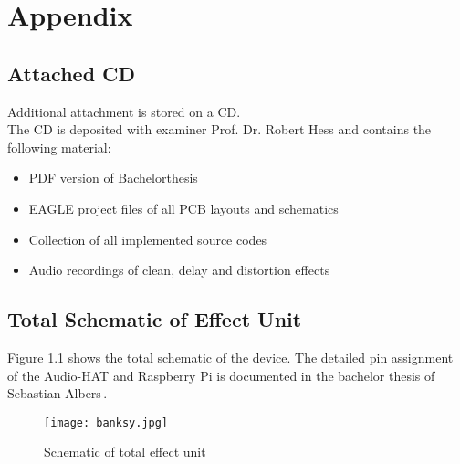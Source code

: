 \newpage
\chapter{Appendix}

\section{Attached CD}\label{DVD}

Additional attachment is stored on a CD.\\
The CD is deposited with examiner Prof. Dr. Robert Hess and contains the following material:

\begin{center} 
   \begin{varwidth}{7in} 
      \begin{itemize} 
      	 \item PDF version of Bachelorthesis 
         \item EAGLE project files of all PCB layouts and schematics
         \item Collection of all implemented source codes
         \item Audio recordings of clean, delay and distortion effects
      \end{itemize} 
   \end{varwidth} 
\end{center} 

\newpage
\section{Total Schematic of Effect Unit}

Figure \ref{fig:UMLoverall} shows the total schematic of the device.
The detailed pin assignment of the Audio-HAT and Raspberry Pi is documented in the bachelor thesis of Sebastian Albers\,\cite[p.\,99]{Albers:2017}.

\begin{figure}[H]
	\centering \texttt{[image: banksy.jpg]}
	\caption[UMLoverall]{Schematic of total effect unit}
	\label{fig:UMLoverall}
\end{figure} 

